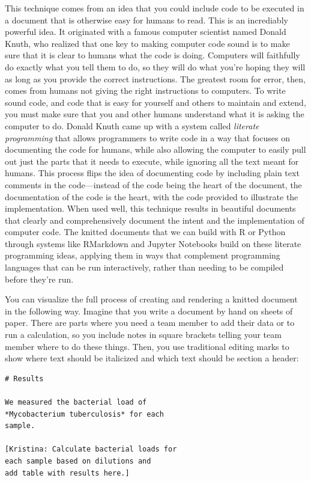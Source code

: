 \documentclass[]{tufte-book}
\begin{document}
This technique comes from an idea that you could include code to be executed in
a document that is otherwise easy for humans to read. This is an incrediably
powerful idea. It originated with a famous computer scientist named Donald
Knuth, who realized that one key to making computer code sound is to make sure
that it is clear to humans what the code is doing. Computers will faithfully do
exactly what you tell them to do, so they will do what you're hoping they will
as long as you provide the correct instructions. The greatest room for error,
then, comes from humans not giving the right instructions to computers. To
write sound code, and code that is easy for yourself and others to maintain and
extend, you must make sure that you and other humans understand what it is
asking the computer to do. Donald Knuth came up with a system called \emph{literate
programming} that allows programmers to write code in a way that focuses on
documenting the code for humans, while also allowing the computer to easily
pull out just the parts that it needs to execute, while ignoring all the text
meant for humans. This process flips the idea of documenting code by including
plain text comments in the code---instead of the code being the heart of the
document, the documentation of the code is the heart, with the code provided
to illustrate the implementation. When used well, this technique results in
beautiful documents that clearly and comprehensively document the intent and
the implementation of computer code. The knitted documents that we can build
with R or Python through systems like RMarkdown and Jupyter Notebooks build
on these literate programming ideas, applying them in ways that complement
programming languages that can be run interactively, rather than needing to
be compiled before they're run.

You can visualize the full process of creating and rendering a knitted document
in the following way. Imagine that you write a document by hand on sheets of
paper. There are parts where you need a team member to add their data or to run
a calculation, so you include notes in square brackets telling your team member
where to do these things. Then, you use traditional editing marks to show where
text should be italicized and which text should be section a header:

\begin{verbatim}
# Results

We measured the bacterial load of 
*Mycobacterium tuberculosis* for each 
sample. 

[Kristina: Calculate bacterial loads for 
each sample based on dilutions and
add table with results here.]
\end{verbatim}
\end{document}
